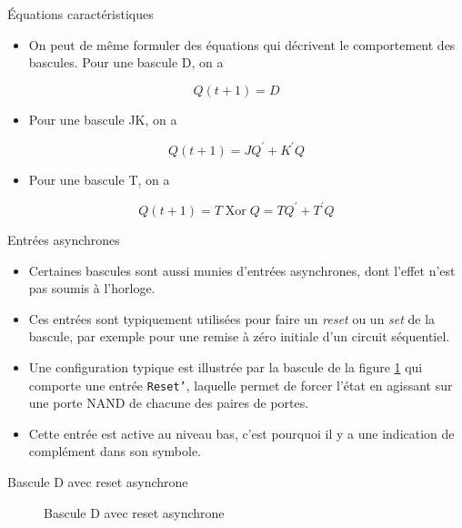 \documentclass[presentation]{beamer}
\begin{document}
\begin{frame}[label={sec:org46850ed}]{Équations caractéristiques}
\begin{itemize}
\item On peut de même formuler des équations qui décrivent le comportement des bascules. Pour une bascule D, on a
\end{itemize}

$$ Q(t+1) = D $$

\begin{itemize}
\item Pour une bascule JK, on a
\end{itemize}

$$ Q(t+1) =J Q^\prime + K^\prime Q $$

\begin{itemize}
\item Pour une bascule T, on a
\end{itemize}

$$ Q(t+1) = T \operatorname{Xor} Q = T Q^\prime + T^\prime Q $$
\end{frame}

\begin{frame}[label={sec:orgb9529b9},fragile]{Entrées asynchrones}
 \begin{itemize}
\item Certaines bascules sont aussi munies d'entrées asynchrones, dont l'effet n'est pas soumis à l'horloge.

\item Ces entrées sont typiquement utilisées pour faire un \emph{reset} ou un \emph{set} de la bascule, par exemple pour une remise à zéro initiale d'un circuit séquentiel.

\item Une configuration typique est illustrée par la bascule de la figure \ref{fig:orgf5aa142} qui comporte une entrée \texttt{Reset'}, laquelle permet de forcer l'état en agissant sur une porte NAND de chacune des paires de portes.

\item Cette entrée est active au niveau bas, c'est pourquoi il y a une indication de complément dans son symbole.
\end{itemize}
\end{frame}

\begin{frame}[label={sec:orge607654}]{Bascule D avec reset asynchrone}
\begin{figure}[htbp]
\centering

\caption{\label{fig:orgf5aa142}Bascule D avec reset asynchrone}
\end{figure}
\end{frame}
\end{document}
